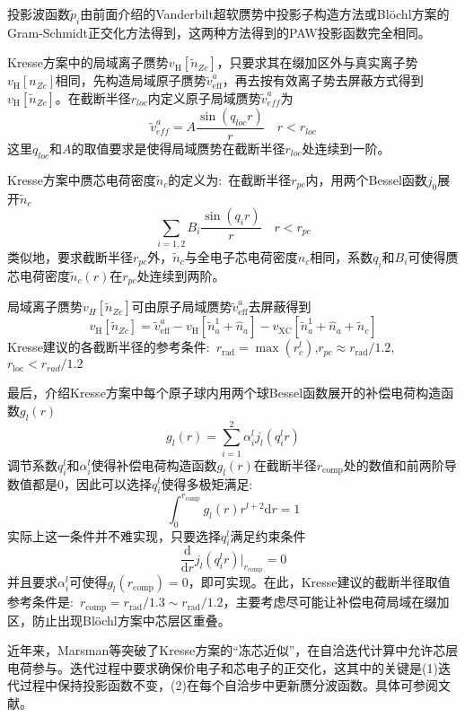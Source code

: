 投影波函数$\tilde p_i$由前面介绍的\textrm{Vanderbilt}超软赝势中投影子构造方法或\textrm{Bl\"ochl}方案的\textrm{Gram-Schmidt}正交化方法得到，这两种方法得到的\textrm{PAW}投影函数完全相同。

\textrm{Kresse}方案中的局域离子赝势$v_{\mathrm H}[\tilde n_{Zc}]$，只要求其在缀加区外与真实离子势$v_{\mathrm H}[n_{Zc}]$相同，先构造局域原子赝势$\tilde v_{\mathrm{eff}}^a$，再去按有效离子势去屏蔽方式得到$v_{\mathrm H}[\tilde n_{Zc}]$。在截断半径$r_{loc}$内定义原子局域赝势$\tilde v_{eff}^a$为
$$\tilde v_{eff}^a=A\dfrac{\sin(q_{loc}r)}r\quad r<r_{loc}$$
这里$q_{loc}$和$A$的取值要求是使得局域赝势在截断半径$r_{loc}$处连续到一阶。

\textrm{Kresse}方案中赝芯电荷密度$\tilde n_c$的定义为:~在截断半径$r_{pc}$内，用两个\textrm{Bessel}函数$j_0$展开$\tilde n_c$
$$\sum_{i=1,2}B_i\dfrac{\sin(q_ir)}r\quad r<r_{pc}$$
类似地，要求截断半径$r_{pc}$外，$\tilde n_c$与全电子芯电荷密度$n_c$相同，系数$q_i$和$B_i$可使得赝芯电荷密度$\tilde n_c(r)$在$r_{pc}$处连续到两阶。

局域离子赝势$v_H[\tilde n_{Zc}]$可由原子局域赝势$\tilde v_{\mathrm{eff}}^a$去屏蔽得到
$$v_{\mathrm H}[\tilde n_{Zc}]=\tilde v_{\mathrm{eff}}^a-v_{\mathrm H}[\tilde n_a^1+\hat n_a]-v_{\mathrm{XC}}[\tilde n_a^1+\hat n_a+\tilde n_c]$$
\textrm{Kresse}建议的各截断半径的参考条件:~$r_{\mathrm{rad}}=\max({r_c^l})$,$r_{pc}\approx r_{\mathrm{rad}}/1.2$,$r_{\mathrm{loc}}<r_{rad}/1.2$

最后，介绍\textrm{Kresse}方案中每个原子球内用两个球\textrm{Bessel}函数展开的补偿电荷构造函数$g_l(r)$
$$g_l(r)=\sum_{i=1}^2\alpha_i^lj_l(q_i^lr)$$
调节系数$q_i^l$和$\alpha_i^l$使得补偿电荷构造函数$g_l(r)$在截断半径$r_{\mathrm{comp}}$处的数值和前两阶导数值都是0，因此可以选择$q_i^l$使得多极矩满足:~
$$\int_0^{r_{\mathrm{comp}}}g_l(r)r^{l+2}\mathrm{d}r=1$$
实际上这一条件并不难实现，只要选择$q_i^l$满足约束条件
$$\dfrac{\mathrm{d}}{\mathrm{d}r}j_l(q_i^lr)\bigg|_{r_{\mathrm{comp}}}=0$$
并且要求$\alpha_i^l$可使得$g_l(r_{\mathrm{comp}})=0$，即可实现。在此，\textrm{Kresse}建议的截断半径取值参考条件是:~$r_{\mathrm{comp}}=r_{\mathrm{rad}}/1.3\sim r_{\mathrm{rad}}/1.2$，主要考虑尽可能让补偿电荷局域在缀加区，防止出现\textrm{Bl\"ochl}方案中芯层区重叠。

近年来，\textrm{Marsman}等突破了\textrm{Kresse}方案的“冻芯近似”，在自洽迭代计算中允许芯层电荷参与。迭代过程中要求确保价电子和芯电子的正交化，这其中的关键是(1)迭代过程中保持投影函数不变，(2)在每个自洽步中更新赝分波函数。具体可参阅文献\cite{JCP125-104101_2006}。

